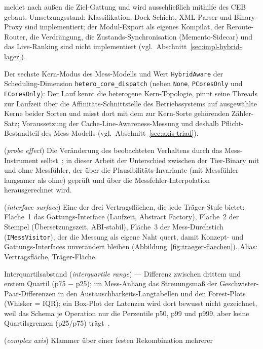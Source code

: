 \begin{description}
  meldet nach außen die Ziel-Gattung und wird ausschließlich mithilfe des CEB gebaut.
  Umsetzungsstand: Klassifikation, Dock-Schicht, XML-Parser und Binary-Proxy sind implementiert; der
  Modul-Export als eigenes Kompilat, der Reroute-Router, die Verdrängung, die
  Zustands-Synchronisation (Memento-Sidecar) und das Live-Ranking sind nicht implementiert
  (vgl.\ Abschnitt~\ref{sec:impl-hybrid-lager}).
  \item[HybridAware] Der sechste Kern-Modus des Mess-Modells und Wert \texttt{HybridAware} der
  Scheduling-Dimension \texttt{hetero\_core\_dispatch} (neben \texttt{None}, \texttt{PCoresOnly} und
  \texttt{ECoresOnly}): Der Lauf kennt die heterogene Kern-Topologie, pinnt seine Threads zur Laufzeit
  über die Affinitäts-Schnittstelle des Betriebssystems auf ausgewählte Kerne beider Sorten und misst
  dort mit dem zur Kern-Sorte gehörenden Zähler-Satz; Voraussetzung der Cache-Line-Awareness-Messung
  und deshalb Pflicht-Bestandteil des Mess-Modells (vgl.\ Abschnitt~\ref{sec:axis-triad}).
  \item[Instrumentierungs-Artefakt] (\emph{probe effect}) Die Veränderung des beobachteten
  Verhaltens durch das Mess-Instrument selbst~\cite{gait1986probe}; in dieser Arbeit der
  Unterschied zwischen der Tier-Binary mit und ohne Messfühler, der über die
  Plausibilitäts-Invariante (mit Messfühler langsamer als ohne) geprüft und über die
  Messfehler-Interpolation herausgerechnet wird.
  \item[Interface-Fläche] (\emph{interface surface}) Eine der drei Vertragsflächen, die jede
  Träger-Stufe bietet: Fläche~1 das Gattungs-Interface (Laufzeit, Abstract Factory), Fläche~2 der
  Stempel (Übersetzungszeit, ABI-stabil), Fläche~3 der Mess-Durchstich (\texttt{IMessVisitor}), der
  die Messung als eigene Naht quert, damit Konzept- und Gattungs-Interfaces unverändert bleiben
  (Abbildung~\ref{fig:traeger-flaechen}). Alias: Vertragsfläche, Träger-Fläche.
  \item[IQR] Interquartilsabstand (\emph{interquartile range}) --- Differenz zwischen drittem und
  erstem Quartil (p75 $-$ p25); im Mess-Anhang das Streuungsmaß der Geschwister-Paar-Differenzen in
  den Austauschbarkeits-Langtabellen und den Forest-Plots (Whisker = IQR); ein Box-Plot der
  Latenzen wird dort bewusst nicht gezeichnet, weil das Schema je Operation nur die Perzentile p50,
  p99 und p999, aber keine Quartilsgrenzen (p25/p75) trägt~\cite{mcgill1978boxplots}.
  \item[Komplex-Achse] (\emph{complex axis}) Klammer über einer festen Rekombination mehrerer

\end{description}

